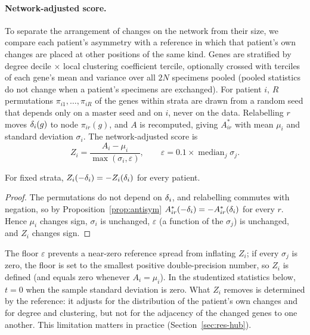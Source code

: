 \paragraph{Network-adjusted score.} To separate the arrangement of changes on the network from their size, we compare each patient's asymmetry with a reference in which that patient's own changes are placed at other positions of the same kind. Genes are stratified by degree decile $\times$ local clustering coefficient tercile, optionally crossed with terciles of each gene's mean and variance over all $2N$ specimens pooled (pooled statistics do not change when a patient's specimens are exchanged). For patient $i$, $R$ permutations $\pi_{i1},\dots,\pi_{iR}$ of the genes within strata are drawn from a random seed that depends only on a master seed and on $i$, never on the data. Relabelling $r$ moves $\delta_i(g)$ to node $\pi_{ir}(g)$, and $A$ is recomputed, giving $A^{*}_{ir}$ with mean $\mu_i$ and standard deviation $\sigma_i$. The network-adjusted score is
\begin{equation}\label{eq:Z}
Z_i=\frac{A_i-\mu_i}{\max(\sigma_i,\varepsilon)},\qquad \varepsilon=0.1\times\operatorname{median}_j\sigma_j .
\end{equation}

\begin{proposition}\label{prop:Z}
For fixed strata, $Z_i(-\delta_i)=-Z_i(\delta_i)$ for every patient.
\end{proposition}
\begin{proof}
The permutations do not depend on $\delta_i$, and relabelling commutes with negation, so by Proposition~\ref{prop:antisym} $A^{*}_{ir}(-\delta_i)=-A^{*}_{ir}(\delta_i)$ for every $r$. Hence $\mu_i$ changes sign, $\sigma_i$ is unchanged, $\varepsilon$ (a function of the $\sigma_j$) is unchanged, and $Z_i$ changes sign.
\end{proof}

The floor $\varepsilon$ prevents a near-zero reference spread from inflating $Z_i$; if every $\sigma_j$ is zero, the floor is set to the smallest positive double-precision number, so $Z_i$ is defined (and equals zero whenever $A_i=\mu_i$). In the studentized statistics below, $t=0$ when the sample standard deviation is zero. What $Z_i$ removes is determined by the reference: it adjusts for the distribution of the patient's own changes and for degree and clustering, but not for the adjacency of the changed genes to one another. This limitation matters in practice (Section~\ref{sec:res-hub}).

